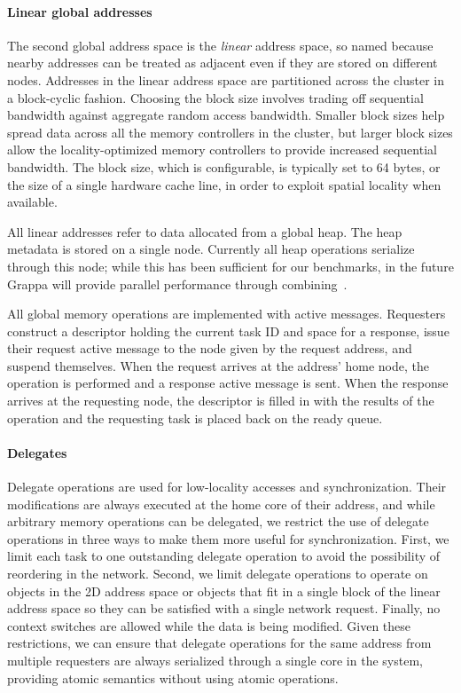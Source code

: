 \paragraph{Linear global addresses} The second global address space is
the {\em linear} address space, so named because nearby addresses can be
treated as adjacent even if they are stored on different nodes.
Addresses in the linear address space are partitioned across the cluster
in a block-cyclic fashion. Choosing the block size involves trading off
sequential bandwidth against aggregate random access bandwidth. Smaller
block sizes help spread data across all the memory controllers in the
cluster, but larger block sizes allow the locality-optimized memory
controllers to provide increased sequential bandwidth. The block size,
which is configurable, is typically set to 64 bytes, or the size of a
single hardware cache line, in order to exploit spatial locality when
available. 

All linear addresses refer to data allocated from a global heap. The
heap metadata is stored on a single node. Currently all heap operations
serialize through this node; while this has been sufficient for our
benchmarks, in the future Grappa will provide parallel performance
through combining~\cite{MAMA,flatcombining}.


All global memory operations are implemented with active
messages. Requesters construct a descriptor holding the current task
ID and space for a response, issue their request active message to the
node given by the request address, and suspend themselves. When the
request arrives at the address' home node, the operation is performed
and a response active message is sent. When the response arrives at
the requesting node, the descriptor is filled in with the results of
the operation and the requesting task is placed back on the ready queue.

\paragraph{Delegates} Delegate operations are used for low-locality
accesses and synchronization. Their modifications are always executed at
the home core of their address, and while arbitrary memory operations
can be delegated, we restrict the use of delegate operations in three
ways to make them more useful for synchronization. First, we limit each
task to one outstanding delegate operation to avoid the possibility of
reordering in the network. Second, we limit delegate operations to
operate on objects in the 2D address space or objects that fit in a
single block of the linear address space so they can be satisfied with a
single network request. Finally, no context switches are allowed while
the data is being modified. Given these restrictions, we can ensure that
delegate operations for the same address from multiple requesters are
always serialized through a single core in the system, providing atomic
semantics without using atomic operations.


